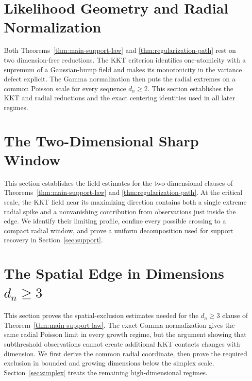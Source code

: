 \documentclass[11pt]{article}
\theoremstyle{remark}
\numberwithin{equation}{section}
\begin{document}
\section{Likelihood Geometry and Radial Normalization}
\label{sec:geometry}

Both Theorems~\ref{thm:main-support-law} and
\ref{thm:regularization-path} rest on two dimension-free reductions. The KKT
criterion identifies one-atomicity with a supremum of a Gaussian-bump field
and makes its monotonicity in the variance defect explicit. The Gamma
normalization then puts the radial extremes on a common Poisson scale for
every sequence \(d_n\ge2\). This section establishes the KKT and radial
reductions and the exact centering identities used in all later regimes.



\section{The Two-Dimensional Sharp Window}
\label{sec:d2}
\label{sec:d-two-sharp-window}

This section establishes the field estimates for the two-dimensional clauses
of Theorems~\ref{thm:main-support-law} and
\ref{thm:regularization-path}. At the critical scale, the KKT field near its
maximizing direction contains both a single extreme radial spike and a
nonvanishing contribution from observations just inside the edge. We identify
their limiting profile, confine every possible crossing to a compact radial
window, and prove a uniform decomposition used for support recovery in
Section~\ref{sec:support}.



\section{The Spatial Edge in Dimensions \texorpdfstring{\(d_n\ge3\)}{at Least Three}}
\label{sec:radial-transition}
\label{sec:spatial-edge}

This section proves the spatial-exclusion estimates needed for the
\(d_n\ge3\) clause of Theorem~\ref{thm:main-support-law}. The exact Gamma
normalization gives the same radial Poisson limit in every growth regime, but
the argument showing that subthreshold observations cannot create additional
KKT contacts changes with dimension. We first derive the common radial
coordinate, then prove the required exclusion in bounded and growing
dimensions below the simplex scale. Section~\ref{sec:simplex} treats the
remaining high-dimensional regimes.
\end{document}
